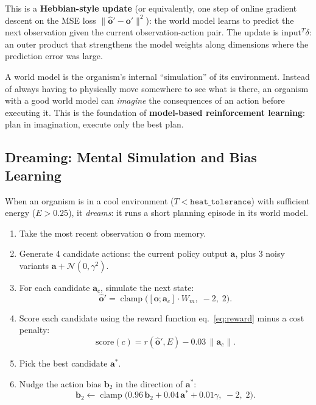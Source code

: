 \documentclass[12pt,a4paper]{article}
\newcommand{\vv}[1]{\mathbf{#1}}
\DeclareMathOperator{\clamp}{clamp}
\begin{document}
This is a \textbf{Hebbian-style update} (or equivalently,
one step of online gradient descent on the MSE loss
$\|\hat{\vv{o}}' - \vv{o}'\|^2$):
the world model learns to predict the next observation
given the current observation-action pair.
The update is $\text{input}^T \delta$:
an outer product that strengthens the model weights along
dimensions where the prediction error was large.

\begin{tcolorbox}[intubox={What is a world model for?}]
A world model is the organism's internal ``simulation'' of its
environment.
Instead of always having to physically move somewhere to see
what is there, an organism with a good world model can
\emph{imagine} the consequences of an action
before executing it.
This is the foundation of \textbf{model-based reinforcement learning}:
plan in imagination, execute only the best plan.
\end{tcolorbox}

\subsection{Dreaming: Mental Simulation and Bias Learning}

When an organism is in a cool environment ($T < \texttt{heat\_tolerance}$)
with sufficient energy ($E > 0.25$),
it \emph{dreams}: it runs a short planning episode
in its world model.

\begin{enumerate}[nosep]
  \item Take the most recent observation $\vv{o}$ from memory.
  \item Generate 4 candidate actions:
    the current policy output $\vv{a}$, plus 3 noisy variants
    $\vv{a} + \mathcal{N}(0, \gamma^2)$.
  \item For each candidate $\vv{a}_c$, simulate the next state:
    \[
      \hat{\vv{o}}' = \clamp\!\bigl([\vv{o};\vv{a}_c]\cdot W_m,\;-2,\;2\bigr).
    \]
  \item Score each candidate using the reward function
    eq.~\eqref{eq:reward} minus a cost penalty:
    \[
      \text{score}(c) = r(\hat{\vv{o}}', E) - 0.03\,\|\vv{a}_c\|.
    \]
  \item Pick the best candidate $\vv{a}^*$.
  \item Nudge the action bias $\vv{b}_2$ in the direction of $\vv{a}^*$:
    \[
      \vv{b}_2 \leftarrow \clamp\!\bigl(
        0.96\,\vv{b}_2 + 0.04\,\vv{a}^* + 0.01\gamma,\;-2,\;2\bigr).
    \]
\end{enumerate}
\end{document}
